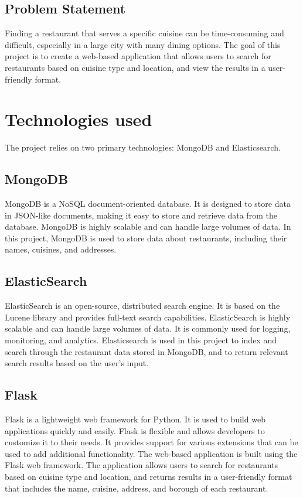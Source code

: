 \documentclass[12pt]{article}
\begin{document}
\subsection{Problem Statement}
Finding a restaurant that serves a specific cuisine can be time-consuming and difficult, especially in a large city with many dining options. The goal of this project is to create a web-based application that allows users to search for restaurants based on cuisine type and location, and view the results in a user-friendly format.

\section{Technologies used}
The project relies on two primary technologies: MongoDB and Elasticsearch. 
\subsection{MongoDB}
MongoDB is a NoSQL document-oriented database. It is designed to store data in JSON-like documents, making it easy to store and retrieve data from the database. MongoDB is highly scalable and can handle large volumes of data. In this project, MongoDB is used to store data about restaurants, including their names, cuisines, and addresses.
\subsection{ElasticSearch}
ElasticSearch is an open-source, distributed search engine. It is based on the Lucene library and provides full-text search capabilities. ElasticSearch is highly scalable and can handle large volumes of data. It is commonly used for logging, monitoring, and analytics. Elasticsearch is used in this project to index and search through the restaurant data stored in MongoDB, and to return relevant search results based on the user's input.
\subsection{Flask}
Flask is a lightweight web framework for Python. It is used to build web applications quickly and easily. Flask is flexible and allows developers to customize it to their needs. It provides support for various extensions that can be used to add additional functionality. The web-based application is built using the Flask web framework. The application allows users to search for restaurants based on cuisine type and location, and returns results in a user-friendly format that includes the name, cuisine, address, and borough of each restaurant. 
\end{document}
